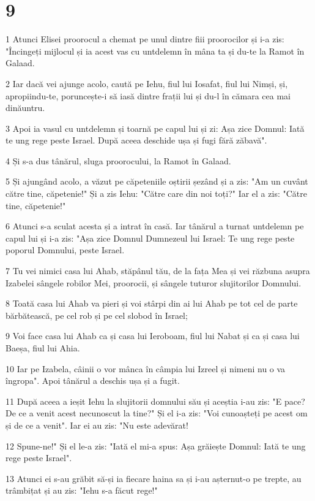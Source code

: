 \chapter{9}

\par 1 Atunci Elisei proorocul a chemat pe unul dintre fiii proorocilor și i-a zis: "Încingeți mijlocul și ia acest vas cu untdelemn în mâna ta și du-te la Ramot în Galaad.
\par 2 Iar dacă vei ajunge acolo, caută pe Iehu, fiul lui Iosafat, fiul lui Nimși, și, apropiindu-te, poruncește-i să iasă dintre frații lui și du-l în cămara cea mai dinăuntru.
\par 3 Apoi ia vasul cu untdelemn și toarnă pe capul lui și zi: Așa zice Domnul: Iată te ung rege peste Israel. După aceea deschide ușa și fugi fără zăbavă".
\par 4 Și s-a dus tânărul, sluga proorocului, la Ramot în Galaad.
\par 5 Și ajungând acolo, a văzut pe căpeteniile oștirii șezând și a zis: "Am un cuvânt către tine, căpetenie!" Și a zis Iehu: "Către care din noi toți?" Iar el a zis: "Către tine, căpetenie!"
\par 6 Atunci s-a sculat acesta și a intrat în casă. Iar tânărul a turnat untdelemn pe capul lui și i-a zis: "Așa zice Domnul Dumnezeul lui Israel: Te ung rege peste poporul Domnului, peste Israel.
\par 7 Tu vei nimici casa lui Ahab, stăpânul tău, de la fața Mea și vei răzbuna asupra Izabelei sângele robilor Mei, proorocii, și sângele tuturor slujitorilor Domnului.
\par 8 Toată casa lui Ahab va pieri și voi stârpi din ai lui Ahab pe tot cel de parte bărbătească, pe cel rob și pe cel slobod în Israel;
\par 9 Voi face casa lui Ahab ca și casa lui Ieroboam, fiul lui Nabat și ca și casa lui Baeșa, fiul lui Ahia.
\par 10 Iar pe Izabela, câinii o vor mânca în câmpia lui Izreel și nimeni nu o va îngropa". Apoi tânărul a deschis ușa și a fugit.
\par 11 După aceea a ieșit Iehu la slujitorii domnului său și aceștia i-au zis: "E pace? De ce a venit acest necunoscut la tine?" Și el i-a zis: "Voi cunoașteți pe acest om și de ce a venit". Iar ei au zis: "Nu este adevărat!
\par 12 Spune-ne!" Și el le-a zis: "Iată el mi-a spus: Așa grăiește Domnul: Iată te ung rege peste Israel".
\par 13 Atunci ei s-au grăbit să-și ia fiecare haina sa și i-au așternut-o pe trepte, au trâmbițat și au zis: "Iehu s-a făcut rege!"
